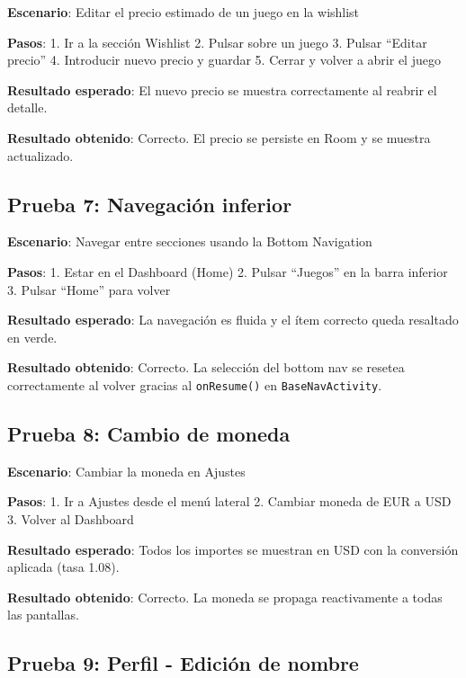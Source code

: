 \documentclass[
  spanish,
  11pt,
  paper=a4,
  ,captions=tableheading
]{scrartcl}
\begin{document}
\textbf{Escenario}: Editar el precio estimado de un juego en la wishlist

\textbf{Pasos}: 1. Ir a la sección Wishlist 2. Pulsar sobre un juego 3.
Pulsar ``Editar precio'' 4. Introducir nuevo precio y guardar 5. Cerrar
y volver a abrir el juego

\textbf{Resultado esperado}: El nuevo precio se muestra correctamente al
reabrir el detalle.

\textbf{Resultado obtenido}: Correcto. El precio se persiste en Room y
se muestra actualizado.

\hypertarget{prueba-7-navegaciuxf3n-inferior}{%
\subsection{Prueba 7: Navegación
inferior}\label{prueba-7-navegaciuxf3n-inferior}}

\textbf{Escenario}: Navegar entre secciones usando la Bottom Navigation

\textbf{Pasos}: 1. Estar en el Dashboard (Home) 2. Pulsar ``Juegos'' en
la barra inferior 3. Pulsar ``Home'' para volver

\textbf{Resultado esperado}: La navegación es fluida y el ítem correcto
queda resaltado en verde.

\textbf{Resultado obtenido}: Correcto. La selección del bottom nav se
resetea correctamente al volver gracias al \texttt{onResume()} en
\texttt{BaseNavActivity}.

\hypertarget{prueba-8-cambio-de-moneda}{%
\subsection{Prueba 8: Cambio de
moneda}\label{prueba-8-cambio-de-moneda}}

\textbf{Escenario}: Cambiar la moneda en Ajustes

\textbf{Pasos}: 1. Ir a Ajustes desde el menú lateral 2. Cambiar moneda
de EUR a USD 3. Volver al Dashboard

\textbf{Resultado esperado}: Todos los importes se muestran en USD con
la conversión aplicada (tasa 1.08).

\textbf{Resultado obtenido}: Correcto. La moneda se propaga
reactivamente a todas las pantallas.

\hypertarget{prueba-9-perfil---ediciuxf3n-de-nombre}{%
\subsection{Prueba 9: Perfil - Edición de
nombre}\label{prueba-9-perfil---ediciuxf3n-de-nombre}}
\end{document}
